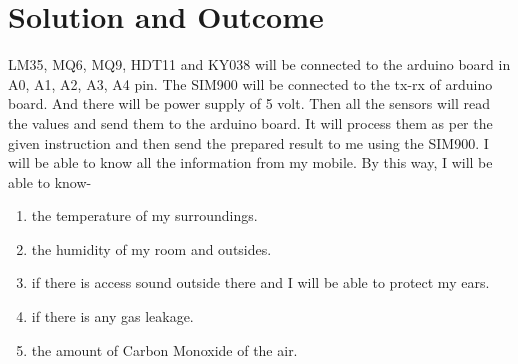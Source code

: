 \chapter{Solution and Outcome}
LM35, MQ6, MQ9, HDT11 and KY038 will be connected to the arduino board in A0, A1, A2, A3, A4 pin. The SIM900 will be connected to the tx-rx of arduino board. And there will be power supply of 5 volt. Then all the sensors will read the values and send them to the arduino board. It will process them as per the given instruction and then send the prepared result to me using the SIM900. I will be able to know all the information from my mobile.\newline
By this way, I will be able to know-
\begin{enumerate}[1.]
    \item the temperature of my surroundings.
    \item the humidity of my room and outsides.
    \item if there is access sound outside there and I will be able to protect my ears.
    \item if there is any gas leakage.
    \item the amount of Carbon Monoxide of the air.
\end{enumerate}